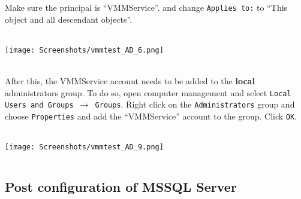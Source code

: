 Make sure the principal is ``VMMService''. and change \texttt{Applies to:} to ``This object and all descendant objects''.
$\;$ \\ \\
\noindent\begin{minipage}{\textwidth}
    \centering
    \texttt{[image: Screenshots/vmmtest\_AD\_6.png]}
\end{minipage}
$\;$ \\ \\
After this, the VMMService account needs to be added to the \textbf{local} administrators group. To do so, open computer management and select \texttt{Local Users and Groups $\rightarrow$ Groups}. Right click on the \texttt{Administrators} group and choose \texttt{Properties} and add the ``VMMService'' account to the group. Click \texttt{OK}.
$\;$ \\ \\
\noindent\begin{minipage}{\textwidth}
    \centering
    \texttt{[image: Screenshots/vmmtest\_AD\_9.png]}
\end{minipage}
$\;$ \\

\subsection{Post configuration of MSSQL Server}

